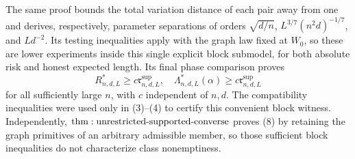 The same proof bounds the total variation distance of each pair away from one and derives, respectively, parameter separations of orders \(\sqrt{d/n}\), \(L^{3/7}(n^2d)^{-1/7}\), and \(Ld^{-2}\).  Its testing inequalities apply with the graph law fixed at \(W_0\), so these are lower experiments inside this single explicit block submodel, for both absolute risk and honest expected length.  Its final phase comparison proves
\[
 R^*_{n,d,L}\geq c\mathfrak r^{\mathrm{sup}}_{n,d,L},
 \quad
 \Lambda^*_{n,d,L}(\alpha)\geq c\mathfrak r^{\mathrm{sup}}_{n,d,L}
\tag{8}
\]
for all sufficiently large \(n\), with \(c\) independent of \(n,d\).  The compatibility inequalities were used only in (3)--(4) to certify this convenient block witness.  Independently, \({\rm thm:unrestricted\text{-}supported\text{-}converse}\) proves (8) by retaining the graph primitives of an arbitrary admissible member, so those sufficient block inequalities do not characterize class nonemptiness.